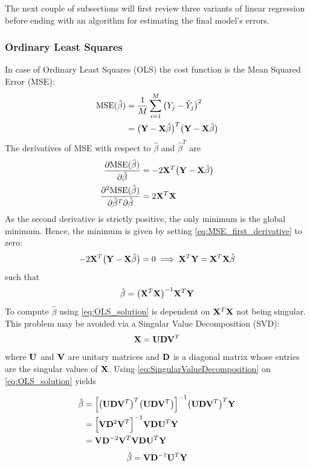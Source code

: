 \documentclass[nofootinbib,reprint,english]{revtex4-1}
\newcommand{\Y}{\vb{Y}}
\newcommand{\X}{\vb{X}}
\newcommand{\betahat}{\hat{\beta}}
\begin{document}
The next couple of subsections will first review three variants of linear regression before ending with an algorithm for estimating the final model's errors.
\subsubsection{Ordinary Least Squares}
In case of Ordinary Least Squares (OLS) the cost function is the Mean Squared Error (MSE):
\begin{subequations}\label{eq:MSE}
\begin{align}
\text{MSE}(\betahat)&=\frac{1}{M}\sum_{i=1}^M\big(Y_j-\tilde{Y}_j\big)^2\\
&=\big(\Y-\X\betahat\big)^T\big(\Y-\X\betahat\big)
\end{align}
\end{subequations}
The derivatives of MSE with respect to \(\betahat\) and \(\betahat^T\) are
\begin{subequations}
\begin{align}
\pdv{\text{MSE}(\betahat)}{\betahat}&=-2\X^T\big(\Y-\X\betahat\big)\label{eq:MSE_first_derivative}\\
\pdv{\text{MSE}(\betahat)}{\betahat^T}{\betahat}&=2\X^T\X\label{eq:MSE_second_derivative}
\end{align}
\end{subequations}
As the second derivative is strictly positive, the only minimum is the global minimum. Hence, the minimum is given by setting \eqref{eq:MSE_first_derivative} to zero:
\[-2\X^T\big(\Y-\X\betahat\big)=0\implies\X^T\Y=\X^T\X\betahat\]
such that
\begin{equation}\label{eq:OLS_solution}
\betahat=\big(\X^T\X\big)^{-1}\X^T\Y
\end{equation}
To compute \(\betahat\) using \eqref{eq:OLS_solution} is dependent on \(\X^T\X\) not being singular. This problem may be avoided via a Singular Value Decomposition (SVD):
\begin{equation}\label{eq:SingularValueDecomposition}
\X=\vb{U}\vb{D}\vb{V}^T
\end{equation}
where \(\vb{U}\) and \(\vb{V}\) are unitary matrices and \(\vb{D}\) is a diagonal matrix whose entries are the singular values of \(\X\). Using \eqref{eq:SingularValueDecomposition} on \eqref{eq:OLS_solution} yields

\begin{align*}
\betahat&=\Big[\big(\vb{U}\vb{D}\vb{V}^T\big)^T\big(\vb{U}\vb{D}\vb{V}^T\big)\Big]^{-1}\big(\vb{U}\vb{D}\vb{V}^T\big)^T\Y\\
&=\Big[\vb{V}\vb{D}^2\vb{V}^T\Big]^{-1}\vb{V}\vb{D}\vb{U}^T\Y\\
&=\vb{V}\vb{D}^{-2}\vb{V}^T\vb{V}\vb{D}\vb{U}^T\Y
\end{align*}
\begin{equation}\label{eq:OLS_solution_SVD}
\betahat=\vb{V}\vb{D}^{-1}\vb{U}^T\Y
\end{equation}
\end{document}
